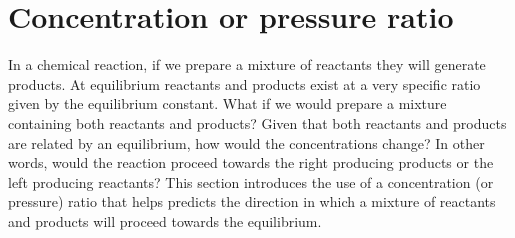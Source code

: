 \documentclass[main.tex]{subfiles}
\begin{document}
\section{ Concentration or pressure ratio}
In a chemical reaction, if we prepare a mixture of reactants they will generate products. At equilibrium reactants and products exist at a very specific ratio given by the equilibrium constant. 
What if we would prepare a mixture containing both reactants and products? Given that both reactants and products are related by an equilibrium, how would the concentrations change?
In other words, would the reaction proceed towards the right producing products or the left producing reactants? This section introduces the use of a concentration (or pressure) ratio that helps predicts the direction in which a mixture of reactants and products will proceed towards the equilibrium.
\sloppy
\end{document}
